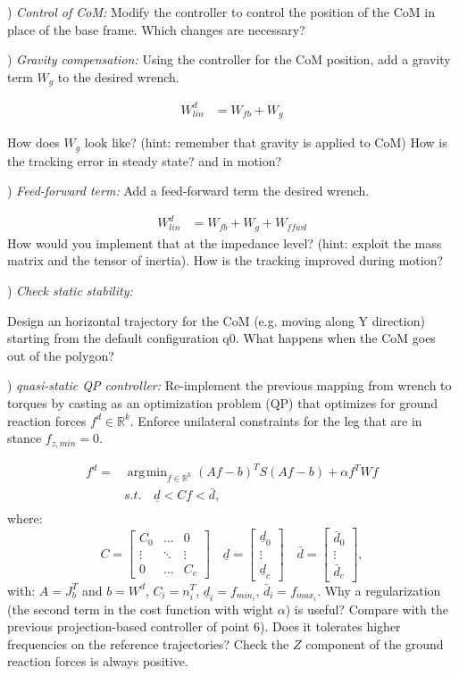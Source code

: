 \documentclass{report}
\newcommand{\Rnum}{\mathbb{R}} %
\newcommand{\mat}[1]{\ensuremath{\begin{bmatrix}#1\end{bmatrix}}}	%
\DeclareMathOperator*{\argmin}{\arg\!\min}				%
\begin{document}
\quad

) \textit{Control of CoM:}
Modify the controller to control the position of the CoM in place of the base frame.
Which changes are necessary?

) \textit{Gravity compensation:}
Using the controller for the CoM position, add a gravity term $W_g$ to the desired wrench.

\begin{align}
W^d_{lin} &= W_{fb} +  W_g
\end{align}

How does $W_g$ look like? (hint: remember that gravity is applied to CoM)
How is the tracking error in steady state? and in motion?

\quad

) \textit{Feed-forward term:}
Add a feed-forward term the desired wrench. 

\begin{align}
W^d_{lin} &= W_{fb} +  W_g + W_{ffwd}
\end{align}
How would you implement that at the impedance level? (hint: exploit the mass matrix and the tensor of inertia).
How is the tracking improved during motion?

\quad

) \textit{Check static stability:}

Design an horizontal trajectory for the CoM (e.g. moving along Y direction) starting from the default configuration q0. 
What happens when the CoM goes out of the polygon?

) \textit{quasi-static QP controller:}
Re-implement the previous mapping from wrench to torques by casting as an optimization problem (QP) that optimizes for ground reaction forces $f^d \in \Rnum^k$. 
Enforce unilateral constraints for the leg that are in stance $f_{z,min} = 0$. 

\begin{equation} 
\begin{aligned} 
f^d = & \argmin_{f \in \Rnum^k} (Af-b)^T S (Af-b) + \alpha f^T W f\\
& s.t. \quad \underline{d} < C f < \bar{d},\\
\end{aligned} 
\label{eq:min_prob}
\end{equation}
%
where:
\begin{equation}
C = \mat{C_0 & \dots & 0 \\ \vdots & \ddots & \vdots \\ 0 & \dots & C_c} \quad
\underline{d} = \mat{ \underline{d}_0 \\ \vdots \\ \underline{d}_c} \quad
\bar{d} = \mat{\bar{d}_0 \\ \vdots \\ \bar{d}_c},
\end{equation}
%
with: $A = J_b^T$ and $b = W^d$, $C_i = 	n_i^T$, $\underline{d}_i = 	f_{{min}_i}$, $\bar{d}_i =f_{{max}_i}$. 
Why a regularization (the second term in the cost function with wight $\alpha$) is useful?
Compare with the previous projection-based controller of point 6). 
Does it tolerates higher frequencies on the reference trajectories?
Check the $Z$ component of the ground reaction forces is always positive.
\end{document}
